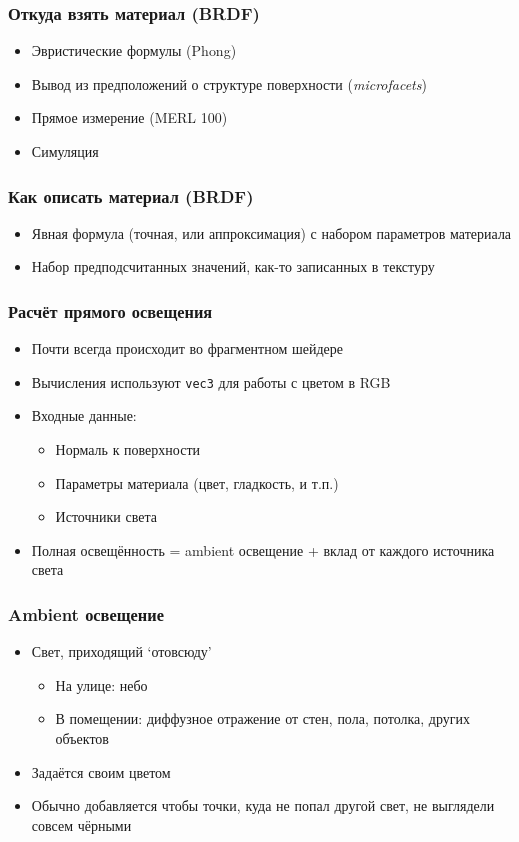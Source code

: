\documentclass{beamer}
\begin{document}
\begin{frame}[fragile]
\frametitle{Откуда взять материал (BRDF)}
\begin{itemize}
\item Эвристические формулы (Phong)
\pause
\item Вывод из предположений о структуре поверхности (\textit{microfacets})
\pause
\item Прямое измерение (MERL 100)
\pause
\item Симуляция
\end{itemize}
\end{frame}

\begin{frame}[fragile]
\frametitle{Как описать материал (BRDF)}
\begin{itemize}
\item Явная формула (точная, или аппроксимация) с набором параметров материала
\pause
\item Набор предподсчитанных значений, как-то записанных в текстуру
\end{itemize}
\end{frame}

\begin{frame}[fragile]
\frametitle{Расчёт прямого освещения}
\begin{itemize}
\item Почти всегда происходит во фрагментном шейдере
\pause
\item Вычисления используют \verb|vec3| для работы с цветом в {\color{red}R}{\color{green}G}{\color{blue}B}
\pause
\item Входные данные:
\pause
\begin{itemize}
\item Нормаль к поверхности
\pause
\item Параметры материала (цвет, гладкость, и т.п.)
\pause
\item Источники света
\end{itemize}
\pause
\item Полная освещённость = ambient освещение + вклад от каждого источника света
\end{itemize}
\end{frame}

\begin{frame}[fragile]
\frametitle{Ambient освещение}
\begin{itemize}
\item Свет, приходящий `отовсюду'
\pause
\begin{itemize}
\item На улице: небо
\pause
\item В помещении: диффузное отражение от стен, пола, потолка, других объектов
\end{itemize}
\pause
\item Задаётся своим цветом
\pause
\item Обычно добавляется чтобы точки, куда не попал другой свет, не выглядели совсем чёрными
\end{itemize}
\end{frame}
\end{document}
